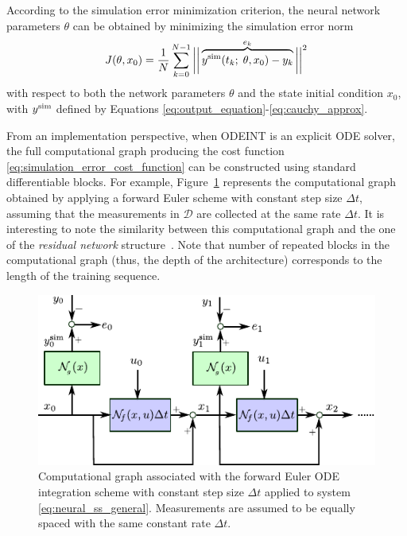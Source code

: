 \documentclass{article} %
\newcommand{\So}{{\mathcal{S}}}            %
\newcommand{\nsamp}{N}
\newcommand{\Did}{{\mathcal{D}}}
\newcommand{\simul}[1]{{#1}^{\rm sim}}
\newcommand{\norm}[1]{\left\lVert#1\right\rVert}
\newcommand{\est}{}
\begin{document}
{
According to the simulation error minimization criterion, 
}
the neural network parameters $\theta$ can be obtained by minimizing the simulation error norm  
\begin{equation}
\label{eq:simulation_error_cost_function}
J(\theta, x_0) = \frac{1}{\nsamp} \sum_{k=0}^{N-1} \bigg|\bigg|%
\overbrace{\simul{\est{y}}(t_k;\; \theta, x_0) -   y_k}^{e_k}
\bigg|\bigg|^2
\end{equation}
with respect to both the network parameters $\theta$ and the state initial condition $x_0$, with $\simul{\est{y}}$  defined by Equations 
\eqref{eq:output_equation}-\eqref{eq:cauchy_approx}.  



From an implementation perspective, when ODEINT is an explicit ODE solver, the full computational graph producing the cost function \eqref{eq:simulation_error_cost_function} can be constructed using standard differentiable blocks. For example, Figure~\ref{fig:forward_euler_graph} represents the computational graph obtained by applying a forward Euler scheme with constant step size $\Delta t$, assuming that the measurements in $\Did$ are collected at the same rate $\Delta t$.
{It is interesting to note the similarity between this computational graph and the one of the \emph{residual network} structure~\cite{he2016deep}.}
{Note that number of repeated blocks in the computational graph (thus, the depth of the architecture) corresponds to the length of the training sequence.}

\begin{figure}
 \centering
 \includegraphics[width=.9\textwidth]{fig/scheme/forward_euler_loss.pdf}
 \caption{Computational graph associated with the forward Euler ODE integration scheme with constant step size $\Delta t$ applied to system \eqref{eq:neural_ss_general}.
  Measurements are assumed to be equally spaced with the same constant rate $\Delta t$.}
 \label{fig:forward_euler_graph}
\end{figure}
\end{document}

